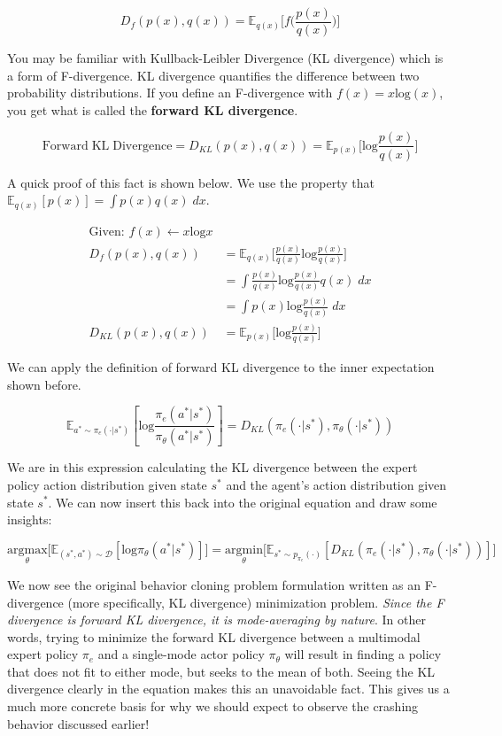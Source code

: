     $$D_f(p(x),q(x)) = \mathbb{E}_{q(x)} \biggl[ f\biggl( \frac{p(x)}{q(x)}\biggr)\biggr]$$
    
    You may be familiar with Kullback-Leibler Divergence (KL divergence) which is a form of F-divergence. KL divergence quantifies the difference between two probability distributions. If you define an F-divergence with $f(x) = x\mathrm{log}(x)$, you get what is called the \textbf{forward KL divergence}.
    
    $$\mathrm{Forward\;KL\;Divergence} = D_{KL}(p(x),q(x)) = \mathbb{E}_{p(x)} \biggl[\mathrm{log}\frac{p(x)}{q(x)}\biggr]$$
    
    A quick proof of this fact is shown below. We use the property that $\mathbb{E}_{q(x)}[p(x)] = \int p(x)q(x)\;dx$.

    \begin{align*}
        \textrm{Given: }f(x) \leftarrow x\mathrm{log}x \\
        D_f(p(x),q(x))\ &= \mathbb{E}_{q(x)} \biggl[ \frac{p(x)}{q(x)}\mathrm{log}\frac{p(x)}{q(x)}\biggr]\\
        &= \int \frac{p(x)}{q(x)}\mathrm{log}\frac{p(x)}{q(x)}q(x)\;dx\\
        &= \int p(x)\mathrm{log}\frac{p(x)}{q(x)}\;dx\\
        D_{KL}(p(x),q(x)) &= \mathbb{E}_{p(x)} \biggl[\mathrm{log}\frac{p(x)}{q(x)}\biggr]
    \end{align*}

    We can apply the definition of forward KL divergence to the inner expectation shown before.

    $$\mathbb{E}_{a^\ast \sim \pi_e(\cdot|s^\ast)}[\mathrm{log}\frac{\pi_e(a^\ast|s^\ast)}{\pi_\theta(a^\ast|s^\ast)}] = D_{KL}(\pi_e(\cdot|s^\ast),\pi_\theta(\cdot|s^\ast))$$

    We are in this expression calculating the KL divergence between the expert policy action distribution given state $s^\ast$ and the agent's action distribution given state $s^\ast$. We can now insert this back into the original equation and draw some insights:

    $$\underset{\theta}{\textrm{argmax}}\biggl[\mathbb{E}_{(s^\ast,a^\ast) \sim \mathcal{D}}[\mathrm{log}\pi_\theta(a^\ast|s^\ast)]\biggr] = \underset{\theta}{\textrm{argmin}}\biggl[\mathbb{E}_{s^\ast \sim p_{\pi_e}(\cdot)}[D_{KL}(\pi_e(\cdot|s^\ast),\pi_\theta(\cdot|s^\ast))]\biggr]$$

    We now see the original behavior cloning problem formulation written as an F-divergence (more specifically, KL divergence) minimization problem. \textit{Since the F divergence is forward KL divergence, it is mode-averaging by nature}. In other words, trying to minimize the forward KL divergence between a multimodal expert policy $\pi_e$ and a single-mode actor policy $\pi_\theta$ will result in finding a policy that does not fit to either mode, but seeks to the mean of both. Seeing the KL divergence clearly in the equation makes this an unavoidable fact. This gives us a much more concrete basis for why we should expect to observe the crashing behavior discussed earlier!

